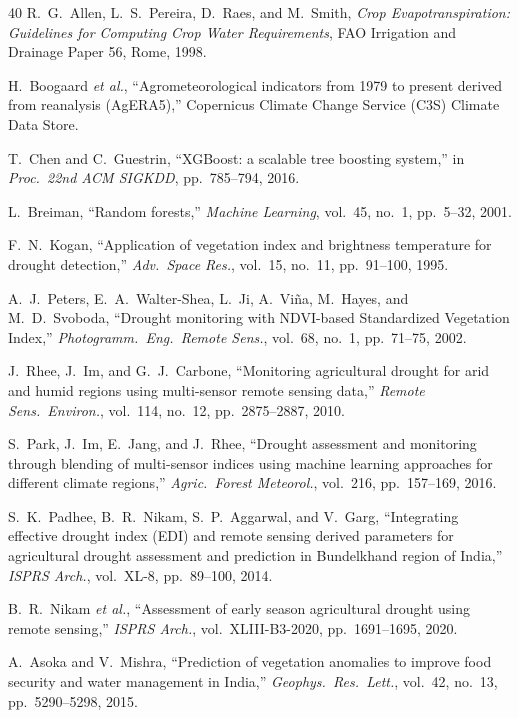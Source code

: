 \documentclass[11pt,a4paper,oneside]{article}
\begin{document}
\begin{thebibliography}{40}
 R.~G.~Allen, L.~S.~Pereira, D.~Raes, and M.~Smith, \textit{Crop Evapotranspiration: Guidelines for Computing Crop Water Requirements}, FAO Irrigation and Drainage Paper 56, Rome, 1998.

 H.~Boogaard \textit{et al.}, ``Agrometeorological indicators from 1979 to present derived from reanalysis (AgERA5),'' Copernicus Climate Change Service (C3S) Climate Data Store.

 T.~Chen and C.~Guestrin, ``XGBoost: a scalable tree boosting system,'' in \textit{Proc.\ 22nd ACM SIGKDD}, pp.~785--794, 2016.

 L.~Breiman, ``Random forests,'' \textit{Machine Learning}, vol.~45, no.~1, pp.~5--32, 2001.

 F.~N.~Kogan, ``Application of vegetation index and brightness temperature for drought detection,'' \textit{Adv.\ Space Res.}, vol.~15, no.~11, pp.~91--100, 1995.

 A.~J.~Peters, E.~A.~Walter-Shea, L.~Ji, A.~Vi\~{n}a, M.~Hayes, and M.~D.~Svoboda, ``Drought monitoring with NDVI-based Standardized Vegetation Index,'' \textit{Photogramm.\ Eng.\ Remote Sens.}, vol.~68, no.~1, pp.~71--75, 2002.

 J.~Rhee, J.~Im, and G.~J.~Carbone, ``Monitoring agricultural drought for arid and humid regions using multi-sensor remote sensing data,'' \textit{Remote Sens.\ Environ.}, vol.~114, no.~12, pp.~2875--2887, 2010.

 S.~Park, J.~Im, E.~Jang, and J.~Rhee, ``Drought assessment and monitoring through blending of multi-sensor indices using machine learning approaches for different climate regions,'' \textit{Agric.\ Forest Meteorol.}, vol.~216, pp.~157--169, 2016.

 S.~K.~Padhee, B.~R.~Nikam, S.~P.~Aggarwal, and V.~Garg, ``Integrating effective drought index (EDI) and remote sensing derived parameters for agricultural drought assessment and prediction in Bundelkhand region of India,'' \textit{ISPRS Arch.}, vol.~XL-8, pp.~89--100, 2014.

 B.~R.~Nikam \textit{et al.}, ``Assessment of early season agricultural drought using remote sensing,'' \textit{ISPRS Arch.}, vol.~XLIII-B3-2020, pp.~1691--1695, 2020.

 A.~Asoka and V.~Mishra, ``Prediction of vegetation anomalies to improve food security and water management in India,'' \textit{Geophys.\ Res.\ Lett.}, vol.~42, no.~13, pp.~5290--5298, 2015.


\end{thebibliography}
\end{document}
